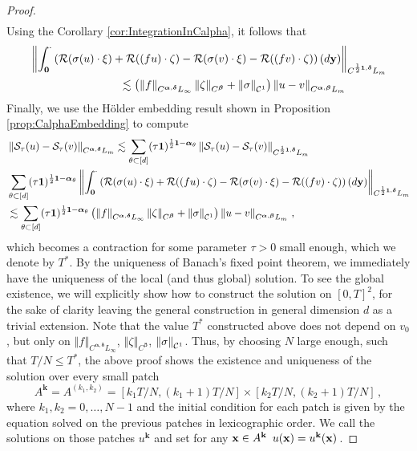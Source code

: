 \documentclass[12pt]{article}
\numberwithin{equation}{section}
\theoremstyle{plain}
\theoremstyle{definition}
\newcommand{\norm}[1]{\left\Vert #1\right\Vert}
\def\cR{\mathcal{R}}\def\cE{\mathcal{E}}
\def\cS{\mathcal{S}}\def\cD{\mathcal{D}}
\def\fk{\mathbf k}\def\fl{\mathbf l}
\def\fy{\mathbf y}\def\fz{\mathbf z}
\def\falpha{{\boldsymbol\alpha}}
\def\fbeta{{\boldsymbol\beta}}
\def\fdelta{{\boldsymbol\delta}}
\def\foo{{\boldsymbol 0}}
\def\fone{{\boldsymbol 1}}
\begin{document}
\begin{proof}
\begin{align*}
     \end{align*}
 Using the Corollary \eqref{cor:IntegrationInCalpha}, it follows that 
 \begin{align*}
&\norm{\int_\foo^{\cdot}\left(\cR(\sigma(u)\cdot\xi)+\cR((fu)\cdot\zeta) - \cR(\sigma(v)\cdot\xi) - \cR((fv)\cdot\zeta)\right)(d\fy)}_{C^{\frac 12\fone,\fdelta}L_m} \\
&\qquad\qquad\qquad\qquad\lesssim \left(\norm{f}_{C^{\falpha,\fdelta}L_\infty} \norm{\zeta}_{C^\fbeta} + \norm{\sigma}_{\cC^1}\right)\norm{u-v}_{C^{\falpha,\fbeta}L_m}
\end{align*}
 Finally, we use the H\"older embedding result shown in Proposition \ref{prop:CalphaEmbedding} to compute
     \begin{align*}
         &\norm{\cS_{\tau}(u)-\cS_{\tau}(v)}_{C^{\falpha,\fdelta}L_m}\lesssim \sum_{\theta\subset[d]} (\tau\fone)^{\frac 12\fone-\falpha_\theta}\norm{\cS_{\tau}(u)-\cS_{\tau}(v)}_{C^{\frac 12\fone,\fdelta}L_m}\\& \sum_{\theta\subset[d]} (\tau\fone)^{\frac 12\fone-\falpha_\theta}\norm{\int_\foo^{\cdot}\left(\cR(\sigma(u)\cdot\xi)+\cR((fu)\cdot\zeta) - \cR(\sigma(v)\cdot\xi) - \cR((fv)\cdot\zeta)\right)(d\fy)}_{C^{\frac 12\fone,\fdelta}L_m}\\
         &\lesssim \sum_{\theta\subset[d]} (\tau\fone)^{\frac 12\fone-\falpha_\theta}\left(\norm{f}_{C^{\falpha,\fdelta}L_\infty} \norm{\zeta}_{C^\fbeta} + \norm{\sigma}_{\cC^1}\right)\norm{u-v}_{C^{\falpha,\fbeta}L_m}\,,
     \end{align*}
     which becomes a contraction for some parameter $\tau>0$ small enough, which we denote by $T^{*}$. By the uniqueness of Banach's fixed point theorem, we immediately have the uniqueness of the local (and thus global) solution. To see the global existence, we will explicitly show how to construct the solution on $[0,T]^2$, for the sake of clarity  leaving the general construction in general dimension $d$ as a trivial extension. Note that the value $T^{*}$ constructed above does not depend on $v_0$, but only on $\norm{f}_{C^{\falpha,\fdelta}L_\infty}$, $ \norm{\zeta}_{C^\fbeta}$, $\norm{\sigma}_{\cC^1}$. Thus, by choosing $N$ large enough, such that $T/N\le T^*$, the above proof shows the existence and uniqueness of the solution over every small patch 
     \[
     A^{\fk} = A^{(k_1,k_2)} = [k_1 T/N, (k_1+1) T/N] \times [k_2 T/N,(k_2+1) T/N]\,,
     \]
     where $k_1,k_2 = 0,\dots, N-1$ and the initial condition for each patch is given by the equation solved on the previous patches in lexicographic order. We call the solutions on those patches $u^{\fk}$ and set for any $\fx\in A^\fk$ $u(\fx) = u^{\fk}(\fx)$\,.

\end{proof}
\end{document}
